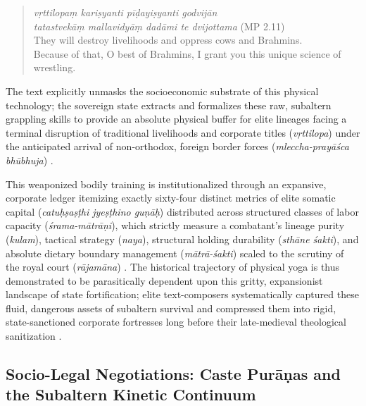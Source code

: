 \documentclass[11pt,twoside,letterpaper]{article}
\begin{document}
\begin{quote}  
\textit{vṛttilopaṃ kariṣyanti pīḍayiṣyanti godvijān} \\
\textit{tatastvekāṃ mallavidyāṃ dadāmi te dvijottama} (MP 2.11) \\
They will destroy livelihoods and oppress cows and Brahmins. \\
Because of that, O best of Brahmins, I grant you this unique science of wrestling.\\
\end{quote}

The text explicitly unmasks the socioeconomic substrate of this physical technology; the sovereign state extracts and formalizes these raw, subaltern grappling skills to provide an absolute physical buffer for elite lineages facing a terminal disruption of traditional livelihoods and corporate titles (\textit{vṛttilopa}) under the anticipated arrival of non-orthodox, foreign border forces (\textit{mleccha-prayāśca bhūbhuja}) \citep{MP_7}. 

This weaponized bodily training is institutionalized through an expansive, corporate ledger itemizing exactly sixty-four distinct metrics of elite somatic capital (\textit{catuḥṣaṣṭhi jyeṣṭhino guṇāḥ}) distributed across structured classes of labor capacity (\textit{śrama-mātrāṇi}), which strictly measure a combatant's lineage purity (\textit{kulam}), tactical strategy (\textit{naya}), structural holding durability (\textit{sthāne śakti}), and absolute dietary boundary management (\textit{mātrā-śakti}) scaled to the scrutiny of the royal court (\textit{rājamāna}) \citep{MP_7, Olivelle2011}. The historical trajectory of physical yoga is thus demonstrated to be parasitically dependent upon this gritty, expansionist landscape of state fortification; elite text-composers systematically captured these fluid, dangerous assets of subaltern survival and compressed them into rigid, state-sanctioned corporate fortresses long before their late-medieval theological sanitization \citep{MP_7, kolff1971, kolff1990}.

\subsection{Socio-Legal Negotiations: Caste Purāṇas and the Subaltern Kinetic Continuum}
\end{document}
